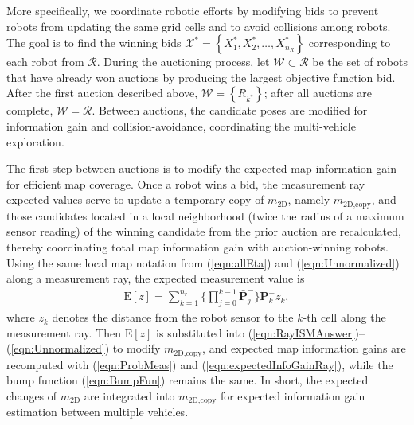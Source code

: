 \documentclass[smallextended]{svjour3}       %
\newcommand{\braces}[1]{\ensuremath{\left\{ #1 \right\}}}
\newcommand{\refeqn}[1]{(\ref{eqn:#1})}
\begin{document}


More specifically, we coordinate robotic efforts by modifying bids to prevent robots from updating the same grid cells and to avoid collisions among robots. The goal is to find the winning bids $\mathcal X^*=\braces{X^*_{1},X^*_{2},\dots,X^*_{n_R}}$ corresponding to each robot from $\mathcal R$. During the auctioning process, let $\mathcal W\subset\mathcal R$ be the set of robots that have already won auctions by producing the largest objective function bid. After the first auction described above, $\mathcal W=\braces{R_{k^*}}$; after all auctions are complete, $\mathcal W=\mathcal R$. Between auctions, the candidate poses are modified for information gain and collision-avoidance, coordinating the multi-vehicle exploration.


The first step between auctions is to modify the expected map information gain for efficient map coverage.  Once a robot wins a bid, the measurement ray expected values serve to update a temporary copy of $m_\text{2D}$, namely $m_\text{2D,copy}$, and those candidates located in a local neighborhood (twice the radius of a maximum sensor reading) of the winning candidate from the prior auction are recalculated, thereby coordinating total map information gain with auction-winning robots. Using the same local map notation from \refeqn{allEta} and \refeqn{Unnormalized} along a measurement ray, the expected measurement value is
\begin{align}
\label{eqn:ExpectedMeasRay}
\text{E}[z]=\sum_{k=1}^{n_{r}}\bigg\{\prod_{j=0}^{k-1}\bar{\mathbf{P}}_j^-\bigg\}\mathbf{P}_k^-z_k,
\end{align}
where $z_k$ denotes the distance from the robot sensor to the $k$-th cell along the measurement ray. Then $\text{E}[z]$ is substituted into \refeqn{RayISMAnswer}--\refeqn{Unnormalized} to modify $m_\text{2D,copy}$, and expected map information gains are recomputed with \refeqn{ProbMeas} and \refeqn{expectedInfoGainRay}, while the bump function \refeqn{BumpFun} remains the same. In short, the expected changes of $m_\text{2D}$ are integrated into $m_\text{2D,copy}$ for expected information gain estimation between multiple vehicles.
\end{document}

